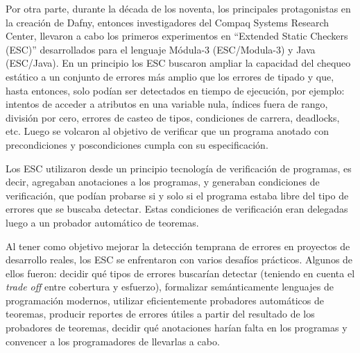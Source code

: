 \documentclass[12pt, a4paper, openany, fleqn]{book}
\begin{document}
    Por otra parte, durante la década de los noventa, los principales protagonistas en la creación de Dafny, entonces investigadores del Compaq Systems Research Center, llevaron a cabo los primeros experimentos en ``Extended Static Checkers (ESC)'' desarrollados para el lenguaje Módula-3 (ESC/Modula-3) y Java (ESC/Java)\cite{Leino2001}.
    En un principio los ESC buscaron ampliar la capacidad del chequeo estático a un conjunto de errores más amplio que los errores de tipado y que, hasta entonces, solo podían ser detectados en tiempo de ejecución, por ejemplo: intentos de acceder a atributos en una variable nula, índices fuera de rango, división por cero, errores de casteo de tipos, condiciones de carrera, deadlocks, etc. Luego se volcaron al objetivo de verificar que un programa anotado con precondiciones y poscondiciones cumpla con su especificación.

    Los ESC utilizaron desde un principio tecnología de verificación de programas, es decir, agregaban anotaciones a los programas, y generaban condiciones de verificación, que podían probarse si y solo si el programa estaba libre del tipo de errores que se buscaba detectar. Estas condiciones de verificación eran delegadas luego a un probador automático de teoremas.

    Al tener como objetivo mejorar la detección temprana de errores en proyectos de desarrollo reales, los ESC se enfrentaron con varios desafíos prácticos. Algunos de ellos fueron: decidir qué tipos de errores buscarían detectar (teniendo en cuenta el \textit{trade off} entre cobertura y esfuerzo), formalizar semánticamente lenguajes de programación modernos, utilizar eficientemente probadores automáticos de teoremas, producir reportes de errores útiles a partir del resultado de los probadores de teoremas, decidir qué anotaciones harían falta en los programas y convencer a los programadores de llevarlas a cabo.
\end{document}
